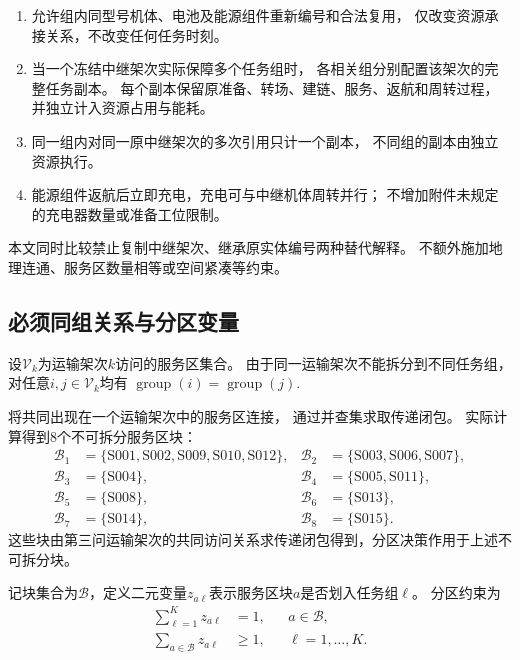\documentclass[bwprint]{gmcmthesis}
\begin{document}
\begin{enumerate}
    \item 允许组内同型号机体、电池及能源组件重新编号和合法复用，
    仅改变资源承接关系，不改变任何任务时刻。

    \item 当一个冻结中继架次实际保障多个任务组时，
    各相关组分别配置该架次的完整任务副本。
    每个副本保留原准备、转场、建链、服务、返航和周转过程，
    并独立计入资源占用与能耗。

    \item 同一组内对同一原中继架次的多次引用只计一个副本，
    不同组的副本由独立资源执行。

    \item 能源组件返航后立即充电，充电可与中继机体周转并行；
    不增加附件未规定的充电器数量或准备工位限制。
\end{enumerate}

本文同时比较禁止复制中继架次、继承原实体编号两种替代解释。
不额外施加地理连通、服务区数量相等或空间紧凑等约束。

\subsection{必须同组关系与分区变量}

设$\mathcal{V}_k$为运输架次$k$访问的服务区集合。
由于同一运输架次不能拆分到不同任务组，
对任意$i,j\in\mathcal{V}_k$均有
\(\operatorname{group}(i)=\operatorname{group}(j)\).

将共同出现在一个运输架次中的服务区连接，
通过并查集求取传递闭包。
实际计算得到8个不可拆分服务区块：
\begin{align*}
\mathcal B_1&=\{\mathrm{S001,S002,S009,S010,S012}\},&
\mathcal B_2&=\{\mathrm{S003,S006,S007}\},\\
\mathcal B_3&=\{\mathrm{S004}\},&
\mathcal B_4&=\{\mathrm{S005,S011}\},\\
\mathcal B_5&=\{\mathrm{S008}\},&
\mathcal B_6&=\{\mathrm{S013}\},\\
\mathcal B_7&=\{\mathrm{S014}\},&
\mathcal B_8&=\{\mathrm{S015}\}.
\end{align*}
这些块由第三问运输架次的共同访问关系求传递闭包得到，分区决策作用于上述不可拆分块。

记块集合为$\mathcal{B}$，定义二元变量$z_{a\ell}$表示服务区块$a$是否划入任务组$\ell$。
分区约束为
\begin{align}
\sum_{\ell=1}^{K}z_{a\ell}&=1,
&& a\in\mathcal{B},\\
\sum_{a\in\mathcal{B}}z_{a\ell}&\geq 1,
&& \ell=1,\ldots,K.
\end{align}
\end{document}
